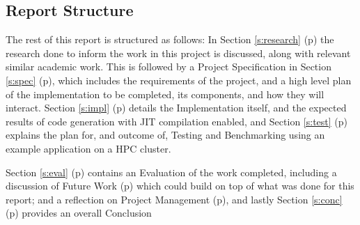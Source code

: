 \clearpage
\subsection{Report Structure}
The rest of this report is structured as follows: In Section \ref{s:research} (p\pageref{s:research}) the research done to inform the work in this project is discussed, along with relevant similar academic work. This is followed by a Project Specification in Section \ref{s:spec} (p\pageref{s:spec}), which includes the requirements of the project, and a high level plan of the implementation to be completed, its components, and how they will interact.
Section \ref{s:impl} (p\pageref{s:impl}) details the Implementation itself, and the expected results of code generation with JIT compilation enabled, and Section \ref{s:test} (p\pageref{s:test}) explains the plan for, and outcome of, Testing and Benchmarking using an example application on a HPC cluster.
\par Section \ref{s:eval} (p\pageref{s:eval}) contains an Evaluation of the work completed, including a discussion of Future Work (p\pageref{ss:fw}) which could build on top of what was done for this report; and a reflection on Project Management (p\pageref{ss:pm}), and lastly Section \ref{s:conc} (p\pageref{s:conc}) provides an overall Conclusion
